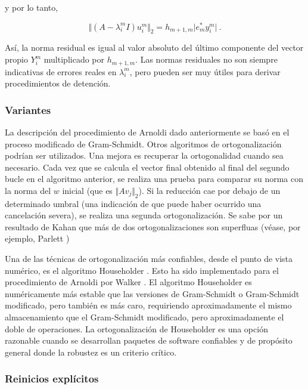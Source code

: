 \documentclass[a4paper,openright,12pt, oneside]{book}
\begin{document}
y por lo tanto,

\begin{displaymath}
\Vert ( A - \lambda_i ^{m}I ) u_i ^{m}\Vert _2 = h_{m+1,m} \vert e_m^{\ast} y_i
^{m}\vert \ .
\end{displaymath}

As\'i, la norma residual es igual al valor absoluto del \'ultimo componente del vector propio $
Y_i ^ {m} $ multiplicado por $ h_ {m + 1, m} $. Las normas residuales no son siempre indicativas de errores reales en $ \lambda_i ^ {m} $, pero pueden ser muy \'utiles para derivar procedimientos de detenci\'on.

\subsubsection{Variantes}

La descripci\'on del procedimiento de Arnoldi dado anteriormente se bas\'o en el proceso modificado de Gram-Schmidt. Otros algoritmos de ortogonalizaci\'on podr\'ian ser utilizados. Una mejora es recuperar la ortogonalidad cuando sea necesario. Cada vez que se calcula el vector final obtenido al final del segundo bucle en el algoritmo anterior, se realiza una prueba para comparar su norma con la norma del $ w $ inicial (que es $ \Vert A v_j \Vert_2 $). Si la reducci\'on cae por debajo de un determinado umbral (una indicaci\'on de que puede haber ocurrido una cancelaci\'on severa), se realiza una segunda ortogonalizaci\'on. Se sabe por un resultado de Kahan que m\'as de dos ortogonalizaciones son superfluas (v\'ease, por ejemplo, Parlett \cite{Parlett})

Una de las t\'ecnicas de ortogonalizaci\'on m\'as confiables, desde el punto de vista num\'erico, es el algoritmo Householder \cite{Householder}. Esto ha sido implementado para el procedimiento de Arnoldi por Walker \cite{Householder2}. El algoritmo Householder es num\'ericamente m\'as estable que las versiones de Gram-Schmidt o Gram-Schmidt modificado, pero tambi\'en es m\'as caro, requiriendo aproximadamente el mismo almacenamiento que el Gram-Schmidt modificado, pero aproximadamente el doble de operaciones. La ortogonalizaci\'on de Householder es una opci\'on razonable cuando se desarrollan paquetes de software confiables y de prop\'osito general donde la robustez es un criterio cr\'itico.

\subsubsection{Reinicios expl\'icitos}
\end{document}

